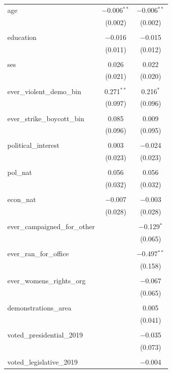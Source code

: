 \begin{table}[!htbp]
\begin{tabular}{@{\extracolsep{5pt}}lcc}
 age & $-$0.006$^{**}$ & $-$0.006$^{**}$ \\ 
  & (0.002) & (0.002) \\ 
  & & \\ 
 education & $-$0.016 & $-$0.015 \\ 
  & (0.011) & (0.012) \\ 
  & & \\ 
 ses & 0.026 & 0.022 \\ 
  & (0.021) & (0.020) \\ 
  & & \\ 
 ever\_violent\_demo\_bin & 0.271$^{**}$ & 0.216$^{*}$ \\ 
  & (0.097) & (0.096) \\ 
  & & \\ 
 ever\_strike\_boycott\_bin & 0.085 & 0.009 \\ 
  & (0.096) & (0.095) \\ 
  & & \\ 
 political\_interest & 0.003 & $-$0.024 \\ 
  & (0.023) & (0.023) \\ 
  & & \\ 
 pol\_nat & 0.056 & 0.056 \\ 
  & (0.032) & (0.032) \\ 
  & & \\ 
 econ\_nat & $-$0.007 & $-$0.003 \\ 
  & (0.028) & (0.028) \\ 
  & & \\ 
 ever\_campaigned\_for\_other &  & $-$0.129$^{*}$ \\ 
  &  & (0.065) \\ 
  & & \\ 
 ever\_ran\_for\_office &  & $-$0.497$^{**}$ \\ 
  &  & (0.158) \\ 
  & & \\ 
 ever\_womens\_rights\_org &  & $-$0.067 \\ 
  &  & (0.065) \\ 
  & & \\ 
 demonstrations\_area &  & 0.005 \\ 
  &  & (0.041) \\ 
  & & \\ 
 voted\_presidential\_2019 &  & $-$0.035 \\ 
  &  & (0.073) \\ 
  & & \\ 
 voted\_legislative\_2019 &  & $-$0.004 \\ 

\end{tabular}
\end{table}
